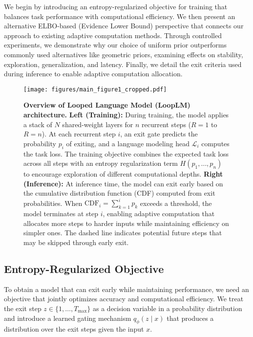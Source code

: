 \documentclass[]{bytedance_seed}
\newcommand{\1}{\mathbf{1}}
\newcommand{\ut}{LoopLM}
\begin{document}
We begin by introducing an entropy-regularized objective for training that balances task 
performance with computational efficiency. We then present an alternative ELBO-based (Evidence Lower Bound) perspective that connects our approach to existing adaptive computation methods. Through controlled experiments, we demonstrate why our choice of uniform prior outperforms commonly used alternatives like geometric priors, examining effects on stability, exploration, generalization, and latency. Finally, we detail the exit criteria used during inference to enable adaptive computation allocation.
\begin{figure}[htbp]
    \centering
    \texttt{[image: figures/main\_figure1\_cropped.pdf]}
    \caption{\textbf{Overview of Looped Language Model (\ut{}) architecture.} 
    \textbf{Left (Training):} During training, the model applies a stack of $N$ shared-weight layers 
    for $n$ recurrent steps ($R=1$ to $R=n$). At each recurrent step $i$, an exit gate predicts 
    the probability $p_i$ of exiting, and a language modeling head $\mathcal{L}_i$ computes 
    the task loss. The training objective combines the expected task loss across all steps 
    with an entropy regularization term $H(p_1, \ldots, p_n)$ to encourage exploration of 
    different computational depths. 
    \textbf{Right (Inference):} At inference time, the model can exit early based on the 
    cumulative distribution function (CDF) computed from exit probabilities. When 
    $\text{CDF}_i = \sum_{k=1}^{i} p_k$ exceeds a threshold, the model terminates at step $i$, 
    enabling adaptive computation that allocates more steps to harder inputs while maintaining 
    efficiency on simpler ones. The dashed line indicates potential future steps that may be 
    skipped through early exit.}
    \label{fig:rlm_architecture}
\end{figure}

\subsection{Entropy-Regularized Objective}

To obtain a model that can exit early while maintaining performance, we need an objective that jointly optimizes accuracy and computational efficiency. We treat the exit step $z \in \{1,\dots,T_{\max}\}$ as a decision variable in a probability distribution and introduce a learned gating mechanism $q_\phi(z \mid x)$ that produces a distribution over the exit steps given the input $x$.
\end{document}
